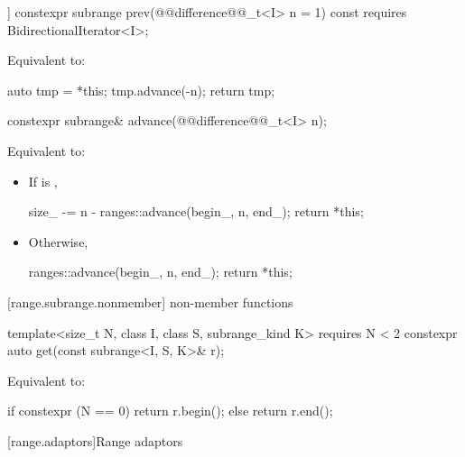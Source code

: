 %
\begin{itemdecl}
[[nodiscard]] constexpr subrange prev(@@difference@@_t<I> n = 1) const
  requires BidirectionalIterator<I>;
\end{itemdecl}

\begin{itemdescr}
\pnum
\effects Equivalent to:
\begin{codeblock}
auto tmp = *this;
tmp.advance(-n);
return tmp;
\end{codeblock}
\end{itemdescr}

%
\begin{itemdecl}
constexpr subrange& advance(@@difference@@_t<I> n);
\end{itemdecl}

\begin{itemdescr}
\pnum
\effects Equivalent to:
\begin{itemize}
\item If  is ,
\begin{codeblock}
size_ -= n - ranges::advance(begin_, n, end_);
return *this;
\end{codeblock}
\item Otherwise,
\begin{codeblock}
ranges::advance(begin_, n, end_);
return *this;
\end{codeblock}
\end{itemize}
\end{itemdescr}

[range.subrange.nonmember]{ non-member functions}

%
\begin{itemdecl}
template<size_t N, class I, class S, subrange_kind K>
  requires N < 2
constexpr auto get(const subrange<I, S, K>& r);
\end{itemdecl}

\begin{itemdescr}
\pnum
\effects Equivalent to:
\begin{codeblock}
if constexpr (N == 0)
  return r.begin();
else
  return r.end();
\end{codeblock}
\end{itemdescr}

[range.adaptors]{Range adaptors}

